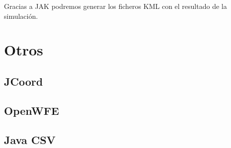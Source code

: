 Gracias a JAK podremos generar los ficheros KML con el resultado de la
simulación.

\section*{Otros}


\subsection*{JCoord}

\subsection*{OpenWFE}

\subsection*{Java CSV}